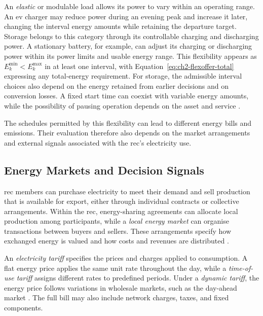 An \emph{elastic} or modulable load allows its power to vary within an operating range. An \gls{ev} charger may reduce power during an evening peak and increase it later, changing the interval energy amounts while retaining the departure target. Storage belongs to this category through its controllable charging and discharging power. A stationary battery, for example, can adjust its charging or discharging power within its power limits and usable energy range. This flexibility appears as $E_k^{\min}<E_k^{\max}$ in at least one interval, with Equation~\ref{eq:ch2-flexoffer-total} expressing any total-energy requirement. For storage, the admissible interval choices also depend on the energy retained from earlier decisions and on conversion losses. A fixed start time can coexist with variable energy amounts, while the possibility of pausing operation depends on the asset and service \parencite{fonseca2022flexloads,hussain2023flexibility,siksnys2019flexoffers}.

The schedules permitted by this flexibility can lead to different energy bills and emissions. Their evaluation therefore also depends on the market arrangements and external signals associated with the \gls{rec}'s electricity use.

\subsection{Energy Markets and Decision Signals}
\label{sec:ch2-energy-markets}

\gls{rec} members can purchase electricity to meet their demand and sell production that is available for export, either through individual contracts or collective arrangements. Within the \gls{rec}, energy-sharing agreements can allocate local production among participants, while a \emph{local energy market} can organise transactions between buyers and sellers. These arrangements specify how exchanged energy is valued and how costs and revenues are distributed \parencite{moret2019energycollectives,reis2021businessmodels}.

An \emph{electricity tariff} specifies the prices and charges applied to consumption. A flat energy price applies the same unit rate throughout the day, while a \emph{time-of-use tariff} assigns different rates to predefined periods. Under a \emph{dynamic tariff}, the energy price follows variations in wholesale markets, such as the day-ahead market \parencite{ersetariffstructure,eu2019electricity}. The full bill may also include network charges, taxes, and fixed components.

